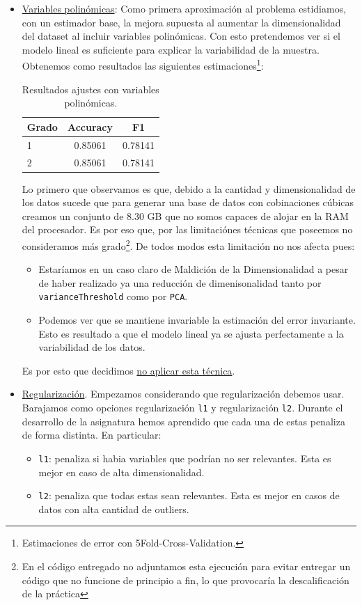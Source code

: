 \documentclass[11pt,a4paper]{article}
\begin{document}
\begin{itemize}
\item \underline{Variables polinómicas}: Como primera aproximación al problema estidiamos, con un estimador base, la mejora supuesta al aumentar la dimensionalidad del dataset al incluir variables polinómicas. Con esto pretendemos ver si el modelo lineal es suficiente para explicar la variabilidad de la muestra. Obtenemos como resultados las siguientes estimaciones\footnote{Estimaciones de error con  5Fold-Cross-Validation.}:

\begin{table}[h]
\begin{center}
\begin{tabular}{|l|c|c|}
\hline
	Grado & Accuracy & F1 \\ \hline
1 & 0.85061 & 0.78141 \\
2 & 0.85061 & 0.78141  \\\hline
\end{tabular}
\caption{Resultados ajustes con variables polinómicas.}

\end{center}
\end{table}

Lo primero que observamos es que, debido a la cantidad y dimensionalidad de los datos sucede que para generar una base de datos con cobinaciones cúbicas creamos un conjunto de 8.30 GB que no somos capaces de alojar en la RAM del procesador. Es por eso que, por las limitaciónes técnicas que poseemos no consideramos más grado\footnote{En el código entregado no adjuntamos esta ejecución para evitar entregar un código que no funcione de principio a fin, lo que provocaría la descalificación de la práctica}. De todos modos esta limitación no nos afecta pues:
\begin{itemize}
	\item Estaríamos en un caso claro de Maldición de la Dimensionalidad\cite{maldim} a pesar de haber realizado ya una reducción de dimenisonalidad tanto por \texttt{varianceThreshold} como por \texttt{PCA}.
	\item Podemos ver que se mantiene invariable la estimación del error invariante. Esto es resultado a que el modelo lineal ya se ajusta perfectamente a la variabilidad de los datos. 
\end{itemize}

Es por esto que decidimos \underline{no aplicar esta técnica}.
\item \underline{Regularización}. Empezamos considerando que regularización debemos usar. Barajamos como opciones regularización \texttt{l1} y regularización \texttt{l2}. Durante el desarrollo de la asignatura hemos aprendido que cada una de estas penaliza de forma distinta. En particular:
  \begin{itemize}
  \item \texttt{l1}: penaliza si habia variables que podrían no ser relevantes. Esta es mejor en caso de alta dimensionalidad.
  \item \texttt{l2}: penaliza que todas estas sean relevantes. Esta es mejor en casos de datos con alta cantidad de outliers.
  \end{itemize}


\end{itemize}
\end{document}

